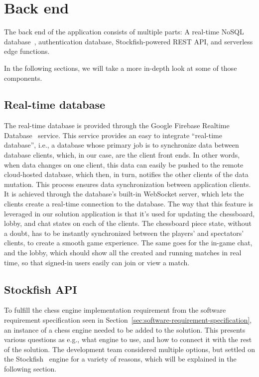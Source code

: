 \section{Back end}\label{sec:backend}

The back end of the application consists of multiple parts: A real-time NoSQL database~\cite{nosql}, authentication
database, Stockfish-powered REST API, and serverless edge functions.

In the following sections, we will take a more in-depth look at some of those components.

\subsection{Real-time database}\label{subsec:real-time-database}

The real-time database is provided through the Google Firebase Realtime Database~\cite{realtime-database} service.
This service provides an easy to integrate ``real-time database'', i.e., a database whose primary job is to synchronize
data between database clients, which, in our case, are the client front ends.
In other words, when data changes on one client, this data can easily be pushed to the remote cloud-hosted database,
which then, in turn, notifies the other clients of the data mutation.
This process ensures data synchronization between application clients.
It is achieved through the database's built-in WebSocket server, which lets the clients create a real-time connection
to the database.
The way that this feature is leveraged in our solution application is that it's used for updating the chessboard, lobby,
and chat states on each of the clients.
The chessboard piece state, without a doubt, has to be instantly synchronized between the players' and spectators'
clients, to create a smooth game experience.
The same goes for the in-game chat, and the lobby, which should show all the created and running matches in real time,
so that signed-in users easily can join or view a match.

\subsection{Stockfish API}\label{subsec:stockfish-api}

To fulfill the chess engine implementation requirement from the software requirement specification seen in
Section~\ref{sec:software-requirement-specification}, an instance of a chess engine needed to be added to the solution.
This presents various questions as e.g., what engine to use, and how to connect it with the rest of the solution.
The development team considered multiple options,
but settled on the Stockfish~\cite{stockfish} engine for a variety of reasons, which will be explained in the following
section.

